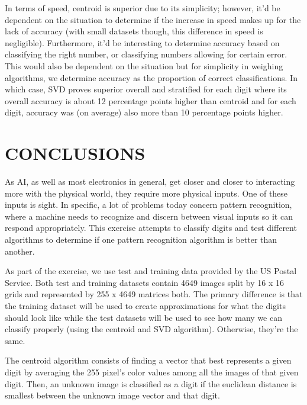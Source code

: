 \documentclass[dvipsnames,12pt]{article} %
\begin{document}
    \vskip 06pt

    \hskip 12pt In terms of speed, centroid is superior due to its simplicity; however, it'd be dependent on the situation to determine if the increase in speed makes up for the lack of accuracy (with small datasets though, this difference in speed is negligible). Furthermore, it'd be interesting to determine accuracy based on classifying the right number, or classifying numbers allowing for certain error. This would also be dependent on the situation but for simplicity in weighing algorithms, we determine accuracy as the proportion of correct classifications. In which case, SVD proves superior overall and stratified for each digit where its overall accuracy is about 12 percentage points higher than centroid and for each digit, accuracy was (on average) also more than 10 percentage points higher.

    \vspace*{12pt}

  \section{CONCLUSIONS}
    \label{SECT 06:CONCLUSIONS}


    \hskip 12pt As AI, as well as most electronics in general, get closer and closer to interacting more with the physical world, they require more physical inputs. One of these inputs is sight. In specific, a lot of problems today concern pattern recognition, where a machine needs to recognize and discern between visual inputs so it can respond appropriately. This exercise attempts to classify digits and test different algorithms to determine if one pattern recognition algorithm is better than another.

    \vskip 06pt 

    \hskip 12pt As part of the exercise, we use test and training data provided by the US Postal Service. Both test and training datasets contain 4649 images split by 16 x 16 grids and represented by 255 x 4649 matrices both. The primary difference is that the training dataset will be used to create approximations for what the digits should look like while the test datasets will be used to see how many we can classify properly (using the centroid and SVD algorithm). Otherwise, they're the same.

    \vskip 06pt

    \hskip 12pt The centroid algorithm consists of finding a vector that best represents a given digit by averaging the 255 pixel's color values among all the images of that given digit. Then, an unknown image is classified as a digit if the euclidean distance is smallest between the unknown image vector and that digit.
\end{document}
